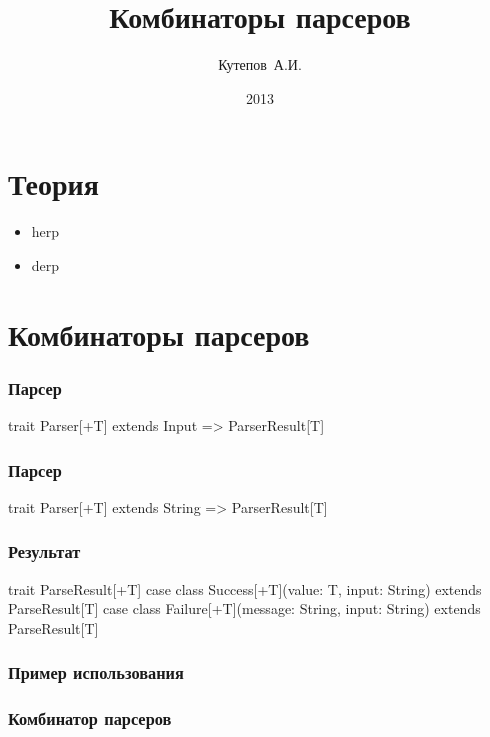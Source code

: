 \documentclass{beamer}
\title{Комбинаторы парсеров}
\author{Кутепов~А.И.}
\date{2013}
\begin{document}
\begin{frame}
  \titlepage
\end{frame}

\begin{frame}
  \tableofcontents
\end{frame}

\section{Теория}

\begin{frame}
  \begin{itemize}
  \item herp \pause
  \item derp
  \end{itemize}
\end{frame}

\section{Комбинаторы парсеров}

\begin{frame}[fragile]
  \frametitle{Парсер}
  \begin{semiverbatim}
    trait Parser[+T]\pause{} extends Input => ParserResult[T]
  \end{semiverbatim}
\end{frame}

\begin{frame}[fragile]
  \frametitle{Парсер}
  \begin{semiverbatim}
    trait Parser[+T] extends {\color{red}String} => ParserResult[T]
  \end{semiverbatim}
\end{frame}

\begin{frame}[fragile]
  \frametitle{Результат}
  \begin{semiverbatim}
    trait ParseResult[+T]
    \pause
    case class Success[+T](value: T, input: String)
      extends ParseResult[T]
    \pause
    case class Failure[+T](message: String, input: String) 
      extends ParseResult[T]
  \end{semiverbatim}
\end{frame}

\begin{frame}[fragile]
  \frametitle{Пример использования}
  \begin{semiverbatim}
  \end{semiverbatim}
\end{frame}

\begin{frame}[fragile]
  \frametitle{Комбинатор парсеров}
  \begin{semiverbatim}
  \end{semiverbatim}
\end{frame}
\end{document}
